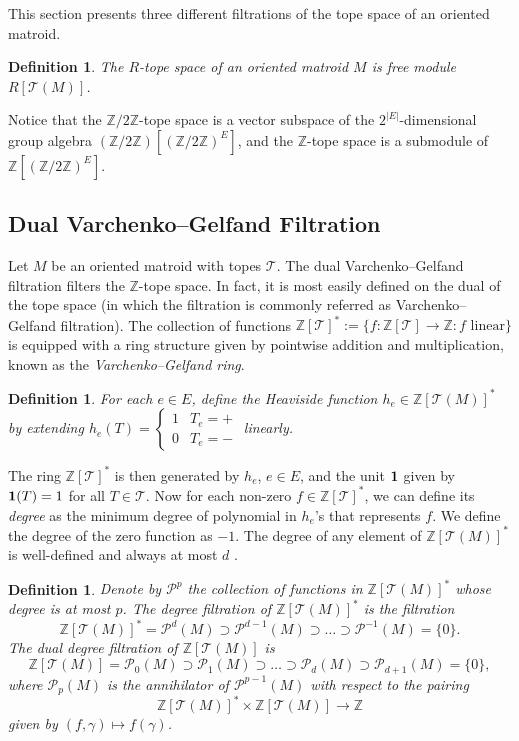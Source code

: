 \documentclass{amsart}
\newtheorem{definition}[theorem]{Definition}
\newcommand\Pcal{{\mathcal P}}
\newcommand\Tcal{{\mathcal T}}
\newcommand\ZZ{{\mathbb Z}}
\newcommand\Ztwo{{\mathbb Z}/2{\mathbb Z}}
\begin{document}
{This section presents three different filtrations of the tope space of an oriented matroid. 

\begin{definition}
The \emph{$R$-tope space} of an oriented matroid $M$ is free module $R[\Tcal(M)]$.
\end{definition}

Notice that the $\Ztwo$-tope space is a vector subspace of the $2^{|E|}$-dimensional group algebra 
$(\Ztwo)[(\Ztwo)^E]$, and the $\ZZ$-tope space is a submodule of $\ZZ [(\Ztwo)^E]$.

\subsection{Dual Varchenko--Gelfand Filtration} \label{sec:GV}

Let $M$ be an oriented matroid with topes $\Tcal$. The dual Varchenko--Gelfand filtration filters the $\ZZ$-tope space. In fact, it is most easily defined on the dual of the tope space (in which the filtration is commonly referred as Varchenko--Gelfand filtration). 
The collection of functions $\ZZ[\Tcal]^*:=\{f:\ZZ[\Tcal]\rightarrow\ZZ: f \text{ linear}\}$ is equipped with a ring structure given by pointwise addition and multiplication, known as the {\em Varchenko--Gelfand ring}.

\begin{definition}
For each $e\in E$, define the {\em Heaviside function} $h_e\in\ZZ[\Tcal(M)]^*$ by extending $h_e(T)=
\begin{cases}
  1  & T_e= + \\
  0 & T_e = -
\end{cases}$
linearly.
\end{definition}

The ring $\ZZ[\Tcal]^*$ is then generated by $h_e$, $e\in E$, and the unit ${\bf 1}$ given by ${\bf 1}(T) = 1$ for all $T \in \Tcal$.
Now for each non-zero $f\in \ZZ[\Tcal]^*$, we can define its {\em degree} as the minimum degree of polynomial in $h_e$'s that represents $f$. We define the degree of the zero function as $-1$.
The degree of any element of $\ZZ[\Tcal(M)]^*$ is well-defined and always at most $d$ \cite{GV87}.

\begin{definition}
Denote by $\Pcal^p$ the collection of functions in $\ZZ[\Tcal(M)]^*$ whose degree is at most $p$.
The {\em degree filtration} of $\ZZ[\Tcal(M)]^*$ is the filtration $$\ZZ[\Tcal(M)]^*=\Pcal^d(M)\supset\Pcal^{d-1}(M)\supset\ldots\supset\Pcal^{-1}(M)=\{0\}.$$
The {\em dual degree filtration} of $\ZZ[\Tcal(M)]$ is $$\ZZ[\Tcal(M)]=\Pcal_0(M)\supset\Pcal_1(M)\supset\ldots\supset\Pcal_d(M)\supset\Pcal_{d+1}(M)=\{0\},$$ where $\Pcal_p(M)$ is the annihilator of $\Pcal^{p-1}(M)$ with respect to the pairing $$\ZZ[\Tcal(M)]^*\times\ZZ[\Tcal(M)]\rightarrow\ZZ$$ given by $(f,\gamma)\mapsto f(\gamma)$.


\end{definition}}
\end{document}
